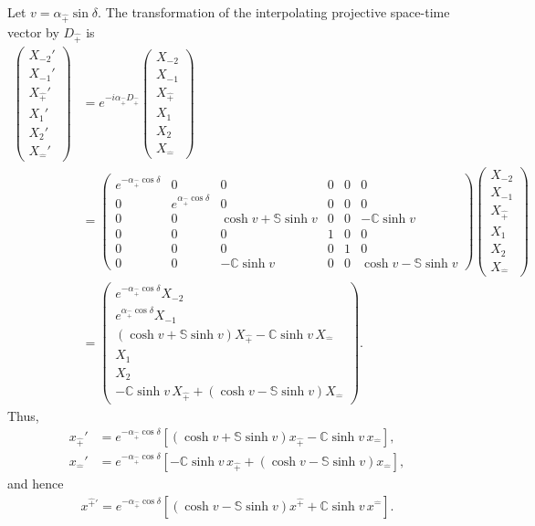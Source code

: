 \documentclass[foundations,article,submit,pdftex,moreauthors]{Definitions/mdpi}
\begin{document}
Let $v=\alpha_{\hat{+}}\sin\delta$. The transformation of the interpolating projective
space-time vector by $D_{\hat{+}}$ is
\begin{align}
\begin{pmatrix}
X_{-2}'\\ X_{-1}'\\ X_{\hat{+}}'\\ X_1'\\ X_2'\\ X_{\hat{-}}'
\end{pmatrix}
&=e^{-i\alpha_{\hat{+}}D_{\hat{+}}}
\begin{pmatrix}
X_{-2}\\ X_{-1}\\ X_{\hat{+}}\\ X_1\\ X_2\\ X_{\hat{-}}
\end{pmatrix}\\
&=\begin{pmatrix}
e^{-\alpha_{\hat{+}}\cos\delta} & 0 & 0 & 0 & 0 & 0\\
0 & e^{\alpha_{\hat{+}}\cos\delta} & 0 & 0 & 0 & 0\\
0 & 0 & \cosh v+\mathbb{S}\sinh v & 0 & 0 & -\mathbb{C}\sinh v\\
0 & 0 & 0 & 1 & 0 & 0\\
0 & 0 & 0 & 0 & 1 & 0\\
0 & 0 & -\mathbb{C}\sinh v & 0 & 0 & \cosh v-\mathbb{S}\sinh v
\end{pmatrix}
\begin{pmatrix}
X_{-2}\\ X_{-1}\\ X_{\hat{+}}\\ X_1\\ X_2\\ X_{\hat{-}}
\end{pmatrix}\\
&=\begin{pmatrix}
e^{-\alpha_{\hat{+}}\cos\delta}X_{-2}\\
e^{\alpha_{\hat{+}}\cos\delta}X_{-1}\\
\left(\cosh v+\mathbb{S}\sinh v\right)X_{\hat{+}}
 -\mathbb{C}\sinh v\,X_{\hat{-}}\\
X_1\\ X_2\\
-\mathbb{C}\sinh v\,X_{\hat{+}}
 +\left(\cosh v-\mathbb{S}\sinh v\right)X_{\hat{-}}
\end{pmatrix}.
\end{align}
Thus,
\begin{align}
x_{\hat{+}}'&=e^{-\alpha_{\hat{+}}\cos\delta}
\left[\left(\cosh v+\mathbb{S}\sinh v\right)x_{\hat{+}}
 -\mathbb{C}\sinh v\,x_{\hat{-}}\right], \nonumber\\
x_{\hat{-}}'&=e^{-\alpha_{\hat{+}}\cos\delta}
\left[-\mathbb{C}\sinh v\,x_{\hat{+}}
 +\left(\cosh v-\mathbb{S}\sinh v\right)x_{\hat{-}}\right],
\end{align}
and hence
\begin{align}
x^{\hat{+}\prime}
=e^{-\alpha_{\hat{+}}\cos\delta}
\left[\left(\cosh v-\mathbb{S}\sinh v\right)x^{\hat{+}}
 +\mathbb{C}\sinh v\,x^{\hat{-}}\right].
\end{align}
\end{document}

